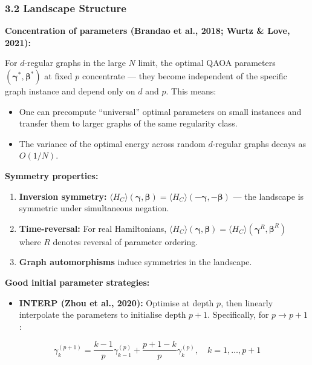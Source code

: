 \documentclass[
  11pt,
]{report}
\providecommand{\tightlist}{%
  \setlength{\itemsep}{0pt}\setlength{\parskip}{0pt}}
\begin{document}
\subsubsection{3.2 Landscape Structure}\label{landscape-structure}

\textbf{Concentration of parameters (Brandao et al., 2018; Wurtz \&
Love, 2021):}

For \(d\)-regular graphs in the large \(N\) limit, the optimal QAOA
parameters \((\boldsymbol{\gamma}^*, \boldsymbol{\beta}^*)\) at fixed
\(p\) concentrate --- they become independent of the specific graph
instance and depend only on \(d\) and \(p\). This means:

\begin{itemize}
\tightlist
\item
  One can precompute ``universal'' optimal parameters on small instances
  and transfer them to larger graphs of the same regularity class.
\item
  The variance of the optimal energy across random \(d\)-regular graphs
  decays as \(O(1/N)\).
\end{itemize}

\textbf{Symmetry properties:}

\begin{enumerate}
\def\labelenumi{\arabic{enumi}.}
\tightlist
\item
  \textbf{Inversion symmetry:}
  \(\langle H_C \rangle(\boldsymbol{\gamma}, \boldsymbol{\beta}) = \langle H_C \rangle(-\boldsymbol{\gamma}, -\boldsymbol{\beta})\)
  --- the landscape is symmetric under simultaneous negation.
\item
  \textbf{Time-reversal:} For real Hamiltonians,
  \(\langle H_C \rangle(\boldsymbol{\gamma}, \boldsymbol{\beta}) = \langle H_C \rangle(\boldsymbol{\gamma}^R, \boldsymbol{\beta}^R)\)
  where \(R\) denotes reversal of parameter ordering.
\item
  \textbf{Graph automorphisms} induce symmetries in the landscape.
\end{enumerate}

\textbf{Good initial parameter strategies:}

\begin{itemize}
\tightlist
\item
  \textbf{INTERP (Zhou et al., 2020):} Optimise at depth \(p\), then
  linearly interpolate the parameters to initialise depth \(p+1\).
  Specifically, for \(p \to p+1\):
\end{itemize}

\[\gamma_k^{(p+1)} = \frac{k-1}{p}\gamma_{k-1}^{(p)} + \frac{p+1-k}{p}\gamma_k^{(p)}, \quad k = 1, \ldots, p+1\]
\end{document}
